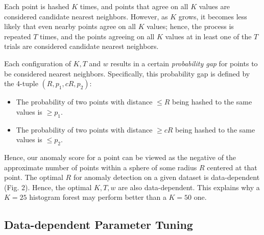 \documentclass[11pt,onecolumn]{article}
\begin{document}
Each point is hashed $K$ times, and points that agree on all $K$ values are considered candidate nearest neighbors. However, as $K$ grows, it becomes less likely that even nearby points agree on all $K$ values; hence, the process is repeated $T$ times, and the points agreeing on all $K$ values at in least one of the $T$ trials are considered candidate nearest neighbors.

Each configuration of $K, T$ and $w$ results in a certain \textit{probability gap} for points to be considered nearest neighbors. Specifically, this probability gap is defined by the 4-tuple $(R, p_1, cR, p_2)$:
\begin{itemize}
	\item The probability of two points with distance $\leq R$ being hashed to the same values is $\geq p_1$.
	\item The probability of two points with distance $\geq cR$ being hashed to the same values is $\leq p_2$.
\end{itemize}

Hence, our anomaly score for a point can be viewed as the negative of the approximate number of points within a sphere of some radius $R$ centered at that point. The optimal $R$ for anomaly detection on a given dataset is data-dependent (Fig. 2). Hence, the optimal $K, T, w$ are also data-dependent. This explains why a $K=25$ histogram forest may perform better than a $K=50$ one.

\subsection{Data-dependent Parameter Tuning}
\end{document}
